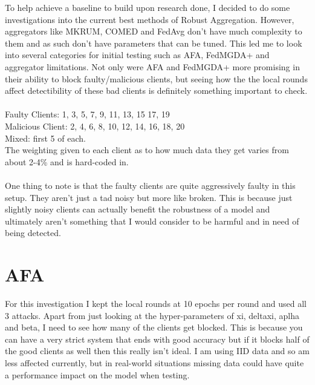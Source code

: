 To help achieve a baseline to build upon research done, I decided to do some investigations into the current best methods of Robust Aggregation.
However, aggregators like MKRUM, COMED and FedAvg don't have much complexity to them and as such don't have parameters that can be tuned.
This led me to look into several categories for initial testing such as AFA, FedMGDA+ and aggregator limitations. Not only were AFA and FedMGDA+ more promising in their ability to block faulty/malicious clients, but seeing how the the local rounds affect detectibility of these bad clients is definitely something important to check.
\\ \\
Faulty Clients: 1, 3, 5, 7, 9, 11, 13, 15 17, 19
\\
Malicious Client: 2, 4, 6, 8, 10, 12, 14, 16, 18, 20
\\
Mixed: first 5 of each.
\\
The weighting given to each client as to how much data they get varies from about 2-4\% and is hard-coded in.
\\ \\
One thing to note is that the faulty clients are quite aggressively faulty in this setup.
They aren't just a tad noisy but more like broken.
This is because just slightly noisy clients can actually benefit the robustness of a model and ultimately aren't something that I would consider to be harmful and in need of being detected.

\section{AFA}
For this investigation I kept the local rounds at 10 epochs per round and used all 3 attacks.
Apart from just looking at the hyper-parameters of xi, deltaxi, aplha and beta, I need to see how many of the clients get blocked.
This is because you can have a very strict system that ends with good accuracy but if it blocks half of the good clients as well then this really isn't ideal.
I am using IID data and so am less affected currently, but in real-world situations missing data could have quite a performance impact on the model when testing.

